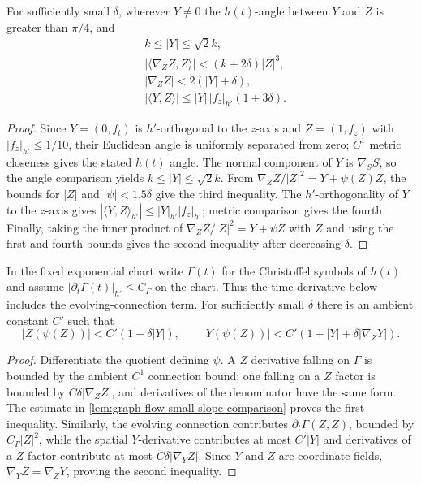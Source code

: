 \begin{theorem}
\label{lem:graph-flow-small-slope-comparison}
\notready
For sufficiently small $\delta$, wherever $Y\ne0$ the $h(t)$-angle between
$Y$ and $Z$ is greater than $\pi/4$, and
\begin{align*}
 &k\le|Y|\le\sqrt2k,\\
 &|\langle\nabla_ZZ,Z\rangle|<(k+2\delta)|Z|^3,\\
 &|\nabla_ZZ|<2(|Y|+\delta),\\
 &|\langle Y,Z\rangle|\le|Y|\,|f_z|_{h'}(1+3\delta).
\end{align*}
\end{theorem}
\begin{proof}
Since $Y=(0,f_t)$ is $h'$-orthogonal to the $z$-axis and
$Z=(1,f_z)$ with $|f_z|_{h'}\le1/10$, their Euclidean angle is uniformly
separated from zero; $C^1$ metric closeness gives the stated $h(t)$ angle.
The normal component of $Y$ is
$\nabla_SS$, so the angle comparison yields
$k\le|Y|\le\sqrt2k$.  From
$\nabla_ZZ/|Z|^2=Y+\psi(Z)Z$, the bounds for $|Z|$ and
$|\psi|<1.5\delta$ give the third inequality.  The $h'$-orthogonality of
$Y$ to the $z$-axis gives
$|\langle Y,Z\rangle_{h'}|\le|Y|_{h'}|f_z|_{h'}$; metric comparison gives
the fourth.  Finally, taking the inner product of
$\nabla_ZZ/|Z|^2=Y+\psi Z$ with $Z$ and using the first and fourth bounds
gives the second inequality after decreasing $\delta$.
\end{proof}

\begin{theorem}
\label{lem:graph-flow-drift-derivative-bounds}
\notready
In the fixed exponential chart write $\Gamma(t)$ for the Christoffel symbols
of $h(t)$ and assume $|\partial_t\Gamma(t)|_{h'}\le C_{\Gamma}$ on the
chart.  Thus the time derivative below includes the evolving-connection term.
For sufficiently small $\delta$ there is an ambient constant $C'$ such that
\[
 |Z(\psi(Z))|<C'(1+\delta|Y|),
 \qquad
 |Y(\psi(Z))|<C'(1+|Y|+\delta|\nabla_ZY|).
\]
\end{theorem}
\begin{proof}
Differentiate the quotient defining $\psi$.  A $Z$ derivative falling on
$\Gamma$ is bounded by the ambient $C^1$ connection bound; one falling on a
$Z$ factor is bounded by $C\delta|\nabla_ZZ|$, and derivatives of the
denominator have the same form.  The estimate in
\ref{lem:graph-flow-small-slope-comparison} proves the first inequality.
Similarly, the evolving connection contributes
$\partial_t\Gamma(Z,Z)$, bounded by $C_{\Gamma}|Z|^2$, while the spatial
$Y$-derivative contributes at most $C'|Y|$ and derivatives of a
$Z$ factor contribute at most $C\delta|\nabla_YZ|$.  Since $Y$ and $Z$ are
coordinate fields, $\nabla_YZ=\nabla_ZY$, proving the second inequality.
\end{proof}


